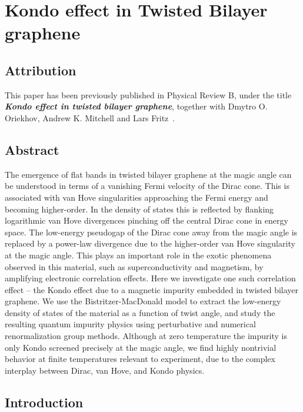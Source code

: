 \chapter{Kondo effect in Twisted Bilayer graphene}
\label{ch:KondoTBG}

\section*{Attribution}
This paper has been previously published in Physical Review B, under the title \textbf{\textit{Kondo effect in twisted bilayer graphene}}, together with Dmytro O. Oriekhov, Andrew K. Mitchell and Lars Fritz~\cite{shankar2023kondo}.

\section*{Abstract}
\noindent The emergence of flat bands in twisted bilayer graphene at the magic angle can be understood in terms of a vanishing Fermi velocity of the Dirac cone. This is associated with van Hove singularities approaching the Fermi energy and becoming higher-order. In the density of states this is reflected by flanking logarithmic van Hove divergences pinching off the central Dirac cone in energy space. The low-energy pseudogap of the Dirac cone away from the magic angle is replaced by a power-law divergence due to the higher-order van Hove singularity at the magic angle.
This plays an important role in the exotic phenomena observed in this material, such as superconductivity and magnetism, by amplifying electronic correlation effects.
Here we investigate one such correlation effect -- the Kondo effect due to a magnetic impurity embedded in twisted bilayer graphene. We use the Bistritzer-MacDonald model to extract the low-energy density of states of the material as a function of twist angle, and study the resulting quantum impurity physics using perturbative and numerical renormalization group methods. Although at zero temperature the impurity is only Kondo screened precisely at the magic angle, we find highly nontrivial behavior at finite temperatures relevant to experiment, due to the complex interplay between Dirac, van Hove, and Kondo physics.

\section{Introduction}

